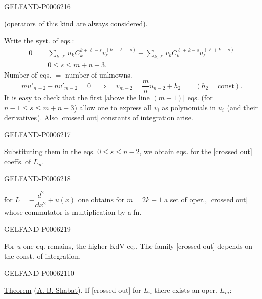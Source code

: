 \begin{GelfandAdjacentEvidence}{GELFAND-P000621}{6}

(operators of this kind are always considered).

Write the syst. of eqs.:
\[
\begin{aligned}
0={}&\sum_{k,\ell}u_k C_k^{k+\ell-s}v_\ell^{(k+\ell-s)}
-\sum_{k,\ell}v_k C_k^{\ell+k-s}u_\ell^{(\ell+k-s)}\\
&0\le s\le m+n-3.
\end{aligned}
\]
Number of eqs. \(=\) number of unknowns.
\[
mu'_{n-2}-nv'_{m-2}=0
\quad\Rightarrow\quad
v_{m-2}=\frac mn u_{n-2}+h_2\qquad(h_2=\mathrm{const}).
\]
It is easy to check that the first [above the line \((m-1)\)] eqs.
(for \(n-1\le s\le m+n-3\)) allow one to express all \(v_i\) as polynomials in \(u_i\)
(and their derivatives). Also [crossed out] constants of integration arise.
\end{GelfandAdjacentEvidence}
\begin{GelfandAdjacentEvidence}{GELFAND-P000621}{7}

Substituting them in the eqs. \(0\le s\le n-2\), we obtain eqs. for the [crossed out] coeffs. of \(L_n\).
\end{GelfandAdjacentEvidence}
\begin{GelfandAdjacentEvidence}{GELFAND-P000621}{8}


for \(L=-\dfrac{d^2}{dx^2}+u(x)\) one obtains for \(m=2k+1\) a set of oper.,
[crossed out] whose commutator is multiplication by a fn.
\end{GelfandAdjacentEvidence}
\begin{GelfandAdjacentEvidence}{GELFAND-P000621}{9}

For \(u\) one eq. remains, the higher KdV eq..
The family [crossed out] depends on the const. of integration.
\end{GelfandAdjacentEvidence}
\begin{GelfandAdjacentEvidence}{GELFAND-P000621}{10}


\underline{Theorem} (\underline{A. B. Shabat}). If [crossed out]
for \(L_n\) there exists an oper. \(L_m\):
\end{GelfandAdjacentEvidence}

